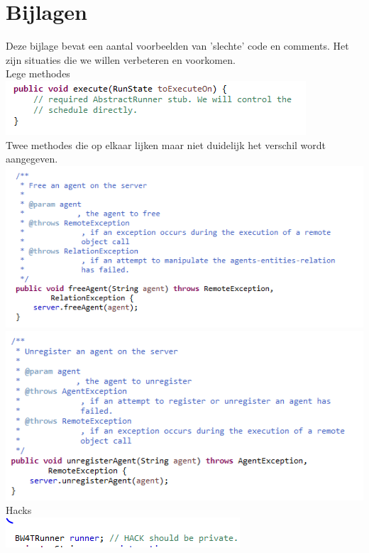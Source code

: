 \documentclass[11pt,a4paper]{article}
\begin{document}
\newpage
\section*{Bijlagen} 
Deze bijlage bevat een aantal voorbeelden van 'slechte' code en comments. Het zijn situaties die we willen verbeteren en voorkomen. \\

Lege methodes \\
\includegraphics[width=\linewidth]{emptyMethod.png} \\ 

Twee methodes die op elkaar lijken maar niet duidelijk het verschil wordt aangegeven. \\
\includegraphics[width=\linewidth]{freeAgentNoClue.png}
\includegraphics[width=\linewidth]{unregisterAgentNoClue.png} \\ 

Hacks \\
\includegraphics[width=\linewidth]{HackWTF.png} \\ 
\end{document}
